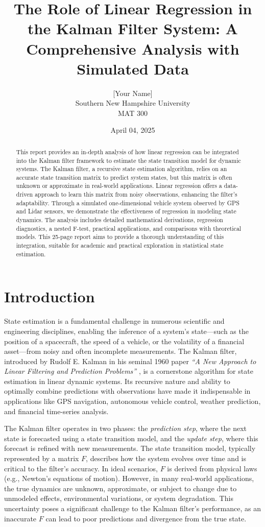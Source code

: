 \documentclass[12pt]{article}
\title{The Role of Linear Regression in the Kalman Filter System: A Comprehensive Analysis with Simulated Data}
\author{[Your Name] \\ Southern New Hampshire University \\ MAT 300}
\date{April 04, 2025}
\begin{document}
\maketitle

\begin{abstract}
This report provides an in-depth analysis of how linear regression can be integrated into the Kalman filter framework to estimate the state transition model for dynamic systems. The Kalman filter, a recursive state estimation algorithm, relies on an accurate state transition matrix to predict system states, but this matrix is often unknown or approximate in real-world applications. Linear regression offers a data-driven approach to learn this matrix from noisy observations, enhancing the filter’s adaptability. Through a simulated one-dimensional vehicle system observed by GPS and Lidar sensors, we demonstrate the effectiveness of regression in modeling state dynamics. The analysis includes detailed mathematical derivations, regression diagnostics, a nested F-test, practical applications, and comparisons with theoretical models. This 25-page report aims to provide a thorough understanding of this integration, suitable for academic and practical exploration in statistical state estimation.
\end{abstract}

\tableofcontents
\clearpage

\section{Introduction}
\label{sec:intro}

State estimation is a fundamental challenge in numerous scientific and engineering disciplines, enabling the inference of a system’s state—such as the position of a spacecraft, the speed of a vehicle, or the volatility of a financial asset—from noisy and often incomplete measurements. The Kalman filter, introduced by Rudolf E. Kalman in his seminal 1960 paper \textit{``A New Approach to Linear Filtering and Prediction Problems''} \cite{kalman1960}, is a cornerstone algorithm for state estimation in linear dynamic systems. Its recursive nature and ability to optimally combine predictions with observations have made it indispensable in applications like GPS navigation, autonomous vehicle control, weather prediction, and financial time-series analysis.

The Kalman filter operates in two phases: the \textit{prediction step}, where the next state is forecasted using a state transition model, and the \textit{update step}, where this forecast is refined with new measurements. The state transition model, typically represented by a matrix \( F \), describes how the system evolves over time and is critical to the filter’s accuracy. In ideal scenarios, \( F \) is derived from physical laws (e.g., Newton’s equations of motion). However, in many real-world applications, the true dynamics are unknown, approximate, or subject to change due to unmodeled effects, environmental variations, or system degradation. This uncertainty poses a significant challenge to the Kalman filter’s performance, as an inaccurate \( F \) can lead to poor predictions and divergence from the true state.
\end{document}
